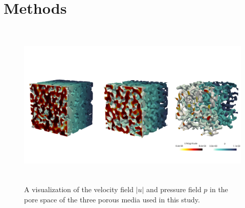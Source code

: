 \documentclass[draft]{agujournal2019}
\begin{document}
\section{Methods}
\begin{figure}[t!]\label{fig:DNS}
\includegraphics[height=8cm]{figures/PM_combined_surfaces_DNS.png}
\caption{A visualization of the velocity field $|u|$ and pressure field $p$ in the pore space of the three porous media used in this study.}
\end{figure}
\end{document}
